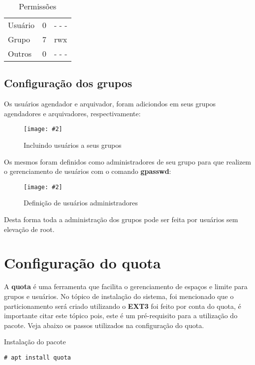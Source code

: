 \documentclass[
	12pt,				%
	openany,			%
	a4paper,			%
	chapter=TITLE,		%
	section=TITLE,		%
	english,
	brazil				%
]{abntex2}
\newcommand{\includeImage}[3] {

\begin{figure}[H]
 	 \centering
  		\texttt{[image: \#2]}
  	\caption{#3}
\end{figure}

}
\begin{document}
\begin{table}[h]
\caption{Permissões}
\centering
\begin{tabular}{r|lr}
\cline{1-3}
\multicolumn{1}{|l|}{Usuário} & \multicolumn{1}{l|}{0} & \multicolumn{1}{l|}{- - -} \\ 
\cline{1-3}
\multicolumn{1}{|l|}{Grupo} & \multicolumn{1}{l|}{7} & \multicolumn{1}{l|}{rwx} \\ 
\cline{1-3}
\multicolumn{1}{|l|}{Outros} & \multicolumn{1}{l|}{0} & \multicolumn{1}{l|}{- - -} \\ 
\cline{1-3}
\end{tabular}
\end{table}

\subsection{Configuração dos grupos}

Os usuários agendador e arquivador, foram adiciondos em seus grupos agendadores e arquivadores, respectivamente:

\includeImage{0.7}{imgs/5_gerenciamento_grupos/adicionando_usuarios_aos_grupos.png}{Incluindo usuários a seus grupos}

Os mesmos foram definidos como administradores de seu grupo para que realizem o gerenciamento de usuários com o comando \textbf{gpasswd}:

\includeImage{0.7}{imgs/5_gerenciamento_grupos/definindo_administrador_dos_grupos.png}{Definição de usuários administradores}

Desta forma toda a administração dos grupos pode ser feita por usuários sem elevação de root.

\section{Configuração do quota}

A \textbf{quota} é uma ferramenta que facilita o gerenciamento de espaços e limite para grupos e usuários. No tópico de instalação do sistema, foi mencionado que o particionamento será criado utilizando o \textbf{EXT3} foi feito por conta do quota, é importante citar este tópico pois, este é um pré-requisito para a utilização do pacote. Veja abaixo os passos utilizados na configuração do quota. 

Instalação do pacote
\begin{lstlisting}
# apt install quota
\end{lstlisting}
\end{document}
